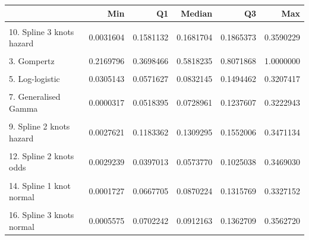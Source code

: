 \documentclass[]{article}
\begin{document}
\begin{tabular}{lrrrrr}
\toprule
  & Min & Q1 & Median & Q3 & Max\\
\midrule
\cellcolor{gray!6}{1. Exponential} & \cellcolor{gray!6}{0.2449482} & \cellcolor{gray!6}{0.2449482} & \cellcolor{gray!6}{0.2449482} & \cellcolor{gray!6}{0.2449482} & \cellcolor{gray!6}{0.2449482}\\
10. Spline 3 knots hazard & 0.0031604 & 0.1581132 & 0.1681704 & 0.1865373 & 0.3590229\\
\cellcolor{gray!6}{2. Weibull} & \cellcolor{gray!6}{0.0907442} & \cellcolor{gray!6}{0.4105709} & \cellcolor{gray!6}{0.4790585} & \cellcolor{gray!6}{0.5216195} & \cellcolor{gray!6}{0.5525972}\\
3. Gompertz & 0.2169796 & 0.3698466 & 0.5818235 & 0.8071868 & 1.0000000\\
\cellcolor{gray!6}{4. Log-normal} & \cellcolor{gray!6}{0.0022958} & \cellcolor{gray!6}{0.1000774} & \cellcolor{gray!6}{0.1279068} & \cellcolor{gray!6}{0.1841659} & \cellcolor{gray!6}{0.3070152}\\
5. Log-logistic & 0.0305143 & 0.0571627 & 0.0832145 & 0.1494462 & 0.3207417\\
\cellcolor{gray!6}{6. Gamma} & \cellcolor{gray!6}{0.0471845} & \cellcolor{gray!6}{0.3701940} & \cellcolor{gray!6}{0.3852535} & \cellcolor{gray!6}{0.3907371} & \cellcolor{gray!6}{0.3935697}\\
7. Generalised Gamma & 0.0000317 & 0.0518395 & 0.0728961 & 0.1237607 & 0.3222943\\
\cellcolor{gray!6}{8. Spline 1 knot hazard} & \cellcolor{gray!6}{0.0048605} & \cellcolor{gray!6}{0.0929348} & \cellcolor{gray!6}{0.1060806} & \cellcolor{gray!6}{0.1322263} & \cellcolor{gray!6}{0.3462113}\\
9. Spline 2 knots hazard & 0.0027621 & 0.1183362 & 0.1309295 & 0.1552006 & 0.3471134\\
\cellcolor{gray!6}{11. Spline 1 knot odds} & \cellcolor{gray!6}{0.0040186} & \cellcolor{gray!6}{0.0370407} & \cellcolor{gray!6}{0.0534928} & \cellcolor{gray!6}{0.0956147} & \cellcolor{gray!6}{0.3493116}\\
12. Spline 2 knots odds & 0.0029239 & 0.0397013 & 0.0573770 & 0.1025038 & 0.3469030\\
\cellcolor{gray!6}{13. Spline 3 knots odds} & \cellcolor{gray!6}{0.0031346} & \cellcolor{gray!6}{0.0443526} & \cellcolor{gray!6}{0.0641665} & \cellcolor{gray!6}{0.1145082} & \cellcolor{gray!6}{0.3547245}\\
14. Spline 1 knot normal & 0.0001727 & 0.0667705 & 0.0870224 & 0.1315769 & 0.3327152\\
\cellcolor{gray!6}{15. Spline 2 knots normal} & \cellcolor{gray!6}{0.0003302} & \cellcolor{gray!6}{0.0575542} & \cellcolor{gray!6}{0.0758377} & \cellcolor{gray!6}{0.1164719} & \cellcolor{gray!6}{0.3361441}\\
16. Spline 3 knots normal & 0.0005575 & 0.0702242 & 0.0912163 & 0.1362709 & 0.3562720\\
\bottomrule
\end{tabular}
\end{document}
